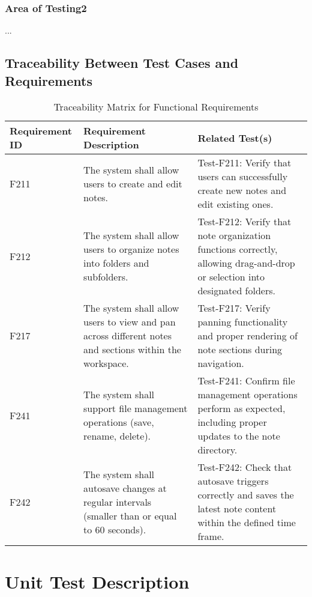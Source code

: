 \documentclass[12pt, titlepage]{article}
\begin{document}
\subsubsection{Area of Testing2}

...

\subsection{Traceability Between Test Cases and Requirements}


\begin{table}[htbp]
\centering
\caption{Traceability Matrix for Functional Requirements}
\begin{tabular}{|p{2.5cm}|p{6cm}|p{6cm}|}
\hline
\textbf{Requirement ID} & \textbf{Requirement Description} & \textbf{Related Test(s)} \\
\hline
F211 & The system shall allow users to create and edit notes. & Test-F211: Verify that users can successfully create new notes and edit existing ones. \\
\hline
F212 & The system shall allow users to organize notes into folders and subfolders. & Test-F212: Verify that note organization functions correctly, allowing drag-and-drop or selection into designated folders. \\
\hline
F217 & The system shall allow users to view and pan across different notes and sections within the workspace. & Test-F217: Verify panning functionality and proper rendering of note sections during navigation. \\
\hline
F241 & The system shall support file management operations (save, rename, delete). & Test-F241: Confirm file management operations perform as expected, including proper updates to the note directory. \\
\hline
F242 & The system shall autosave changes at regular intervals (smaller than or equal to 60 seconds). & Test-F242: Check that autosave triggers correctly and saves the latest note content within the defined time frame. \\
\hline
\end{tabular}
\end{table}

\section{Unit Test Description}
\end{document}
